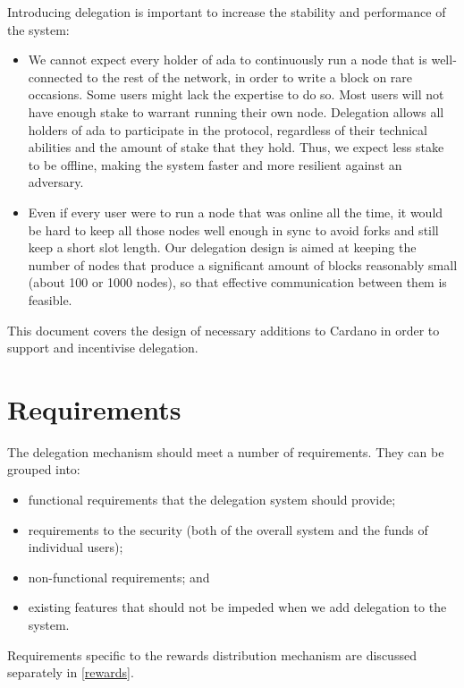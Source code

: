 \documentclass[11pt,a4paper]{article}
\begin{document}
Introducing delegation is important to increase the stability and
performance of the system:

\begin{itemize}
\item
  We cannot expect every holder of ada to continuously run a node that
  is well-connected to the rest of the network, in order to write a
  block on rare occasions. Some users might lack the expertise to do so.
  Most users will not have enough stake to warrant running their own
  node. Delegation allows all holders of ada to participate in the
  protocol, regardless of their technical abilities and the amount of
  stake that they hold. Thus, we expect less stake to be offline, making
  the system faster and more resilient against an adversary.
\item
  Even if every user were to run a node that was online all the time, it
  would be hard to keep all those nodes well enough in sync to avoid
  forks and still keep a short slot length. Our delegation design is
  aimed at keeping the number of nodes that produce a significant amount
  of blocks reasonably small (about 100 or 1000 nodes), so that effective
  communication between them is feasible.
\end{itemize}

This document covers the design of necessary additions to Cardano in
order to support and incentivise delegation.

\section{Requirements}
\label{requirements}

The delegation mechanism should meet a number of requirements. They can
be grouped into:

\begin{itemize}
\item
  functional requirements that the delegation system should provide;
\item
  requirements to the security (both of the overall system and the funds
  of individual users);
\item
  non-functional requirements; and
\item
  existing features that should not be impeded when we add delegation to
  the system.
\end{itemize}

Requirements specific to the rewards distribution mechanism are
discussed separately in \cref{rewards}.
\end{document}
